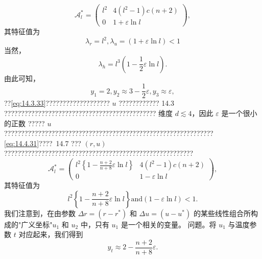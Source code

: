 \begin{equation}\tag{14.4.32}\label{eq:14.4.32}
\mathcal { A } _ { l } ^{*} = \left( \begin{array}{ll} { l ^{2} } & { 4 ( l ^{2} - 1 ) c ( n + 2 ) } \\{ 0 } & { 1 + \varepsilon \ln l } \end{array} \right) ,
\end{equation}
其特征值为
\begin{equation}\tag{14.4.33}\label{eq:14.4.33}
\lambda _ { r } = l ^{2} ,  \lambda _ { u } = ( 1 + \varepsilon \ln l ) < 1
\end{equation}
当然，
\begin{equation}\tag{14.4.34}\label{eq:14.4.34}
\lambda _ { h } = l ^{3} \left( 1 - \frac { 1 } { 2 } \varepsilon \ln l \right) .
\end{equation}
由此可知，
\begin{equation}\tag{14.4.35}\label{eq:14.4.35}
y _ { 1 } = 2 ,  y _ { 2 } \approx 3 - \frac { 1 } { 2 } \varepsilon ,  y _ { 3 } \approx \varepsilon ,
\end{equation}
??\autoref{eq:14.3.33}??????????????????? \(u\) ???????????? 14.3 ?????????????????????????????????????????????
维度 \(d \lesssim 4\)，因此 \(\varepsilon\) 是一个很小的正数
????? \(u\) ??????????????????????????????????????????????????????????????\autoref{eq:14.4.31}????~14.7 ??? \((r,u)\) ????????????????????????????????????????????????????????
\begin{equation}\tag{14.4.36}\label{eq:14.4.36}
\mathcal { A } _ { l } ^{*} = \left( \begin{array}{ll} { { l ^{2} \left\{ 1 - \frac { n + 2 } { n + 8 } \varepsilon \ln l \right\} } } & { { 4 ( l ^{2} - 1 ) c ( n + 2 ) } } \\{ { 0 } } & { { 1 - \varepsilon \ln l } } \end{array} \right) ,
\end{equation}
其特征值为
\begin{equation}\tag{14.4.37}\label{eq:14.4.37}
l ^{2} \left\{ 1 - \frac { n + 2 } { n + 8 } \varepsilon \ln l \right\}  \mathrm { a n d }  ( 1 - \varepsilon \ln l ) < 1 .
\end{equation}
我们注意到，在由参数 \(\Delta r = (r - r^*)\) 和 \(\Delta u = (u - u^*)\) 的某些线性组合所构成的"广义坐标"\(u_{1}\) 和 \(u_{2}\) 中，只有 \(u_{1}\) 是一个相关的变量。
问题。将 \(u_{1}\) 与温度参数 \(t\) 对应起来，我们得到
\begin{equation}\tag{14.4.38}\label{eq:14.4.38}
y _ { t } \approx 2 - \frac { n + 2 } { n + 8 } \varepsilon .
\end{equation}
